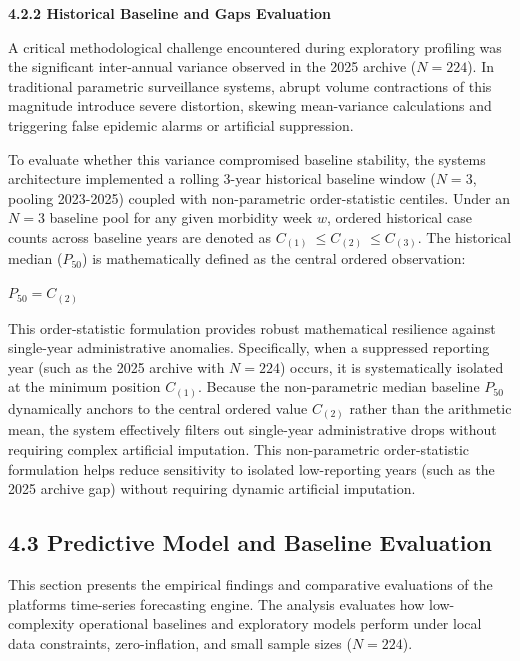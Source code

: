 \documentclass[
]{article}
\begin{document}
\textbf{4.2.2 Historical Baseline and Gaps Evaluation}

A critical methodological challenge encountered during exploratory
profiling was the significant inter-annual variance observed in the 2025
archive (\(N = 224\)). In traditional parametric surveillance systems,
abrupt volume contractions of this magnitude introduce severe
distortion, skewing mean-variance calculations and triggering false
epidemic alarms or artificial suppression.

To evaluate whether this variance compromised baseline stability, the
system\textquotesingle s architecture implemented a rolling 3-year
historical baseline window (\(N = 3\), pooling 2023-2025) coupled with
non-parametric order-statistic centiles. Under an \(N = 3\) baseline
pool for any given morbidity week \(w\), ordered historical case counts
across baseline years are denoted as
\(C_{(1)}\  \leq C_{(2)}\  \leq C_{(3)}\). The historical median
(\(P_{50}\)) is mathematically defined as the central ordered
observation:

\(P_{50} = C_{(2)}\)

This order-statistic formulation provides robust mathematical resilience
against single-year administrative anomalies. Specifically, when a
suppressed reporting year (such as the 2025 archive with \(N = 224\))
occurs, it is systematically isolated at the minimum position
\(C_{(1)}\). Because the non-parametric median baseline \(P_{50}\)
dynamically anchors to the central ordered value \(C_{(2)}\) rather than
the arithmetic mean, the system effectively filters out single-year
administrative drops without requiring complex artificial imputation.
This non-parametric order-statistic formulation helps reduce sensitivity
to isolated low-reporting years (such as the 2025 archive gap) without
requiring dynamic artificial imputation.

\subsection{\texorpdfstring{\textbf{4.3 Predictive Model and Baseline
Evaluation}}{4.3 Predictive Model and Baseline Evaluation}}\label{predictive-model-and-baseline-evaluation}

This section presents the empirical findings and comparative evaluations
of the platform\textquotesingle s time-series forecasting engine. The
analysis evaluates how low-complexity operational baselines and
exploratory models perform under local data constraints, zero-inflation,
and small sample sizes (\(N = 224\)).
\end{document}
